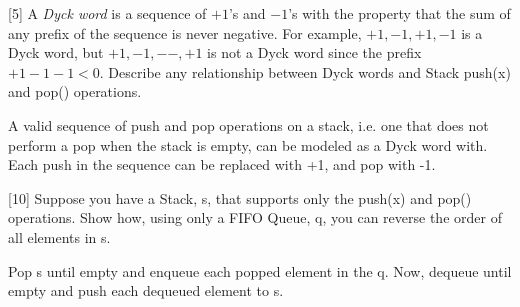 \documentclass[addpoints]{exam}
\begin{document}
\begin{questions}
[5]
A {\it Dyck word} is a sequence of $+1$'s and $-1$'s with the property that the sum of any prefix of the sequence is never negative. For example, $+1, -1, +1,-1$ is a Dyck word, but $+1,-1,−-,+1$ is not a Dyck word since the prefix $+1 -1 -1 < 0$. Describe any relationship between Dyck words and Stack push(x) and pop() operations.
\begin{solution}
  A valid sequence of push and pop operations on a stack, i.e. one that does not perform a pop when the stack is empty, can be modeled as a Dyck word with. Each push in the sequence can be replaced with +1, and pop with -1.
\end{solution}

[10]
Suppose you have a Stack, s, that supports only the push(x) and pop() operations. Show how, using only a FIFO Queue, q, you can reverse the order of all elements in s.
\begin{solution}
  Pop s until empty and enqueue each popped element in the q. Now, dequeue until empty and push each dequeued element to s.
\end{solution}
\end{questions}
\end{document}
